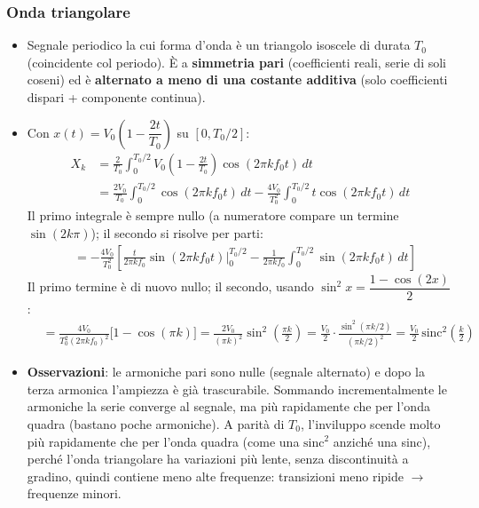 \documentclass[12pt, a4paper]{article}
\begin{document}
\subsubsection{Onda triangolare}
\begin{itemize}
    \item Segnale periodico la cui forma d'onda è un triangolo isoscele di durata $T_0$ (coincidente col periodo). È a \textbf{simmetria pari} (coefficienti reali, serie di soli coseni) ed è \textbf{alternato a meno di una costante additiva} (solo coefficienti dispari + componente continua).
    \item Con $x(t) = V_0\!\left(1-\dfrac{2t}{T_0}\right)$ su $[0,T_0/2]$:
    \begin{align*}
        X_k &= \frac{2}{T_0}\int_0^{T_0/2} V_0\!\left(1-\frac{2t}{T_0}\right)\cos(2\pi kf_0t)\,dt \\
        &= \frac{2V_0}{T_0}\int_0^{T_0/2}\cos(2\pi kf_0t)\,dt - \frac{4V_0}{T_0^2}\int_0^{T_0/2} t\cos(2\pi kf_0t)\,dt
    \end{align*}
    Il primo integrale è sempre nullo (a numeratore compare un termine $\sin(2k\pi)$); il secondo si risolve per parti:
    \begin{align*}
        &= -\frac{4V_0}{T_0^2}\left[\frac{t}{2\pi kf_0}\sin(2\pi kf_0t)\Big|_0^{T_0/2} - \frac{1}{2\pi kf_0}\int_0^{T_0/2}\sin(2\pi kf_0t)\,dt\right]
    \end{align*}
    Il primo termine è di nuovo nullo; il secondo, usando $\sin^2x = \dfrac{1-\cos(2x)}{2}$:
    \begin{align*}
        &= \frac{4V_0}{T_0^2(2\pi kf_0)^2}\big[1-\cos(\pi k)\big] = \frac{2V_0}{(\pi k)^2}\sin^2\!\left(\frac{\pi k}{2}\right) = \frac{V_0}{2}\cdot\frac{\sin^2(\pi k/2)}{(\pi k/2)^2} = \frac{V_0}{2}\,\text{sinc}^2\!\left(\frac{k}{2}\right)
    \end{align*}
    \item \textbf{Osservazioni}: le armoniche pari sono nulle (segnale alternato) e dopo la terza armonica l'ampiezza è già trascurabile. Sommando incrementalmente le armoniche la serie converge al segnale, ma più rapidamente che per l'onda quadra (bastano poche armoniche). A parità di $T_0$, l'inviluppo scende molto più rapidamente che per l'onda quadra (come una $\text{sinc}^2$ anziché una sinc), perché l'onda triangolare ha variazioni più lente, senza discontinuità a gradino, quindi contiene meno alte frequenze: transizioni meno ripide $\to$ frequenze minori.
\end{itemize}
\end{document}
